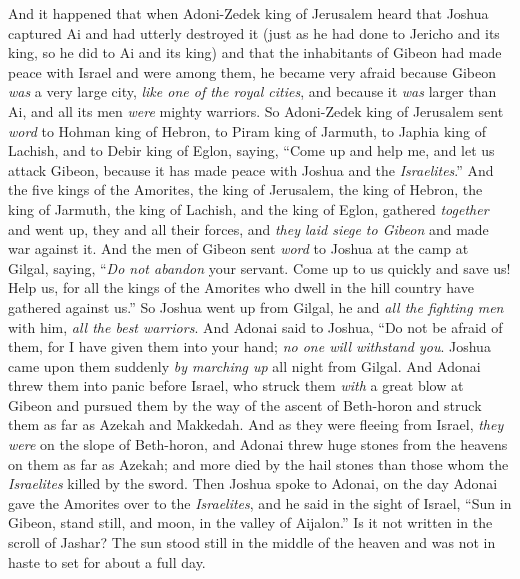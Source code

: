 \begin{biblechapter} %
 And it happened that when Adoni-Zedek king of Jerusalem heard that Joshua captured Ai and had utterly destroyed it (just as he had done to Jericho and its king, so he did to Ai and its king) and that the inhabitants of Gibeon had made peace with Israel and were among them,
\verse he became very afraid because Gibeon \textit{was} a very large city, \textit{like one of the royal cities}, and because it \textit{was} larger than Ai, and all its men \textit{were} mighty warriors.
\verse So Adoni-Zedek king of Jerusalem sent \textit{word} to Hohman king of Hebron, to Piram king of Jarmuth, to Japhia king of Lachish, and to Debir king of Eglon, saying,
\verse “Come up and help me, and let us attack Gibeon, because it has made peace with Joshua and the \textit{Israelites}.”
\verse And the five kings of the Amorites, the king of Jerusalem, the king of Hebron, the king of Jarmuth, the king of Lachish, and the king of Eglon, gathered \textit{together} and went up, they and all their forces, and \textit{they laid siege to Gibeon} and made war against it.
\verse And the men of Gibeon sent \textit{word} to Joshua at the camp at Gilgal, saying, “\textit{Do not abandon} your servant. Come up to us quickly and save us! Help us, for all the kings of the Amorites who dwell in the hill country have gathered against us.”
\verse So Joshua went up from Gilgal, he and \textit{all the fighting men} with him, \textit{all the best warriors}.
\verse And Adonai said to Joshua, “Do not be afraid of them, for I have given them into your hand; \textit{no one will withstand you}.
\verse Joshua came upon them suddenly \textit{by marching up} all night from Gilgal.
\verse And Adonai threw them into panic before Israel, who struck them \textit{with} a great blow at Gibeon and pursued them by the way of the ascent of Beth-horon and struck them as far as Azekah and Makkedah.
\verse And as they were fleeing from Israel, \textit{they were} on the slope of Beth-horon, and Adonai threw huge stones from the heavens on them as far as Azekah; and more died by the hail stones than those whom the \textit{Israelites} killed by the sword.
\verse Then Joshua spoke to Adonai, on the day Adonai gave the Amorites over to the \textit{Israelites}, and he said in the sight of Israel,
\verse “Sun in Gibeon, stand still, 
and moon, in the valley of Aijalon.”
\verse Is it not written in the scroll of Jashar? The sun stood still in the middle of the heaven and was not in haste to set for about a full day.

\end{biblechapter}

